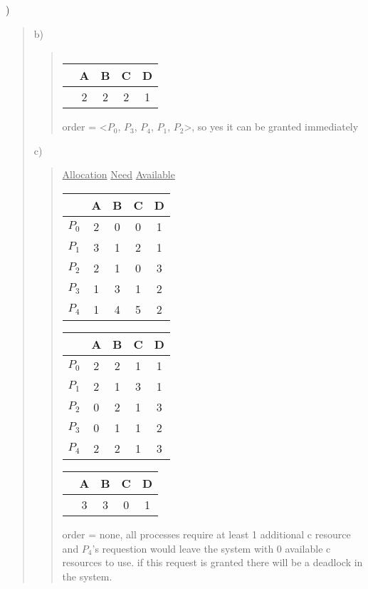 \documentclass[11pt]{article}
\newenvironment{subquestion}[1]{#1) \begin{quote}}{\end{quote}}
\begin{document}
\begin{subquestion}{7.23}
\begin{subquestion}{b}
\begin{table}[h]
\begin{tabular}[t]{l | c | c | c | c|}
        \end{tabular}
        \hfill
        \begin{tabular}[t]{l | c | c | c | c|}
                & A & B & C & D\\\hline
                & 2 & 2 & 2 & 1
        \end{tabular}
      \end{table}
      order = \textless$P_0$, $P_3$, $P_4$, $P_1$, $P_2$\textgreater, so yes it can be granted immediately
    \end{subquestion}
    \begin{subquestion}{c}
      \begin{table}[h]
        \hspace{.8cm}\underline{Allocation} \hfill \underline{Need} \hfill \underline{Available}\hspace{1cm}\null\\
        \vspace{.2cm}
        \begin{tabular}[t]{l | c | c | c | c|}
                & A & B & C & D\\\hline
          $P_0$ & 2 & 0 & 0 & 1\\
          $P_1$ & 3 & 1 & 2 & 1\\
          $P_2$ & 2 & 1 & 0 & 3\\
          $P_3$ & 1 & 3 & 1 & 2\\
          $P_4$ & 1 & 4 & 5 & 2
        \end{tabular}
        \hfill
        \begin{tabular}[t]{l | c | c | c | c|}
                & A & B & C & D\\\hline
          $P_0$ & 2 & 2 & 1 & 1\\
          $P_1$ & 2 & 1 & 3 & 1\\
          $P_2$ & 0 & 2 & 1 & 3\\
          $P_3$ & 0 & 1 & 1 & 2\\
          $P_4$ & 2 & 2 & 1 & 3
        \end{tabular}
        \hfill
        \begin{tabular}[t]{l | c | c | c | c|}
                & A & B & C & D\\\hline
                & 3 & 3 & 0 & 1
        \end{tabular}
      \end{table}
      order = none, all processes require at least 1 additional c resource and $P_4$'s requestion would leave the system with 0 available c resources to use.
      if this request is granted there will be a deadlock in the system.
    \end{subquestion}
  \end{subquestion}
\end{document}
